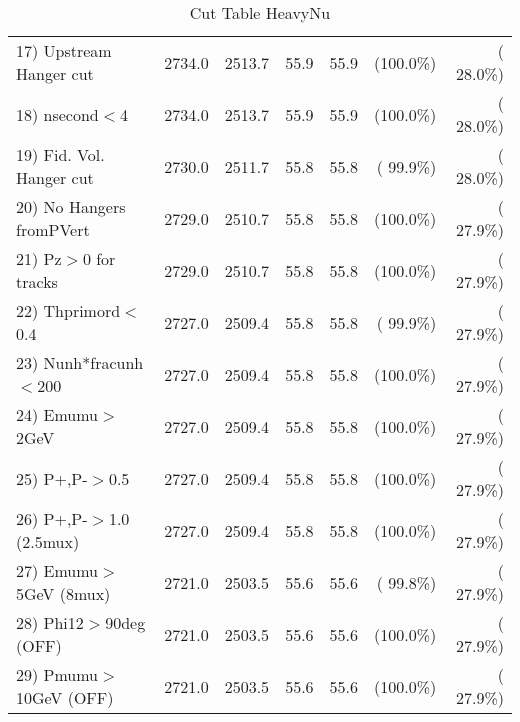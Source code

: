 \begin{table}[h!]
\begin{tabular}{||l||r|r|r|r|r|r||}
 17) Upstream Hanger cut  &       2734.0 &       2513.7 &         55.9 &         55.9 & (100.0\%) & ( 28.0\%) \\
 18) nsecond$<$4          &       2734.0 &       2513.7 &         55.9 &         55.9 & (100.0\%) & ( 28.0\%) \\
 19) Fid. Vol. Hanger cut &       2730.0 &       2511.7 &         55.8 &         55.8 & ( 99.9\%) & ( 28.0\%) \\
 20) No Hangers fromPVert &       2729.0 &       2510.7 &         55.8 &         55.8 & (100.0\%) & ( 27.9\%) \\
 21) Pz$>$0 for tracks    &       2729.0 &       2510.7 &         55.8 &         55.8 & (100.0\%) & ( 27.9\%) \\
 22) Thprimord$<$0.4      &       2727.0 &       2509.4 &         55.8 &         55.8 & ( 99.9\%) & ( 27.9\%) \\
 23) Nunh*fracunh$<$200   &       2727.0 &       2509.4 &         55.8 &         55.8 & (100.0\%) & ( 27.9\%) \\
 24) Emumu$>$2GeV         &       2727.0 &       2509.4 &         55.8 &         55.8 & (100.0\%) & ( 27.9\%) \\
 25) P+,P-$>$0.5          &       2727.0 &       2509.4 &         55.8 &         55.8 & (100.0\%) & ( 27.9\%) \\
 26) P+,P-$>$1.0 (2.5mux) &       2727.0 &       2509.4 &         55.8 &         55.8 & (100.0\%) & ( 27.9\%) \\
 27) Emumu$>$5GeV  (8mux) &       2721.0 &       2503.5 &         55.6 &         55.6 & ( 99.8\%) & ( 27.9\%) \\
 28) Phi12$>$90deg  (OFF) &       2721.0 &       2503.5 &         55.6 &         55.6 & (100.0\%) & ( 27.9\%) \\
 29) Pmumu$>$10GeV  (OFF) &       2721.0 &       2503.5 &         55.6 &         55.6 & (100.0\%) & ( 27.9\%) \\
 \hline
 \hline
 \end{tabular}
 \caption{Cut Table  HeavyNu  }
 \label{tab-cutheavy_neutrino}
 \end{table}
